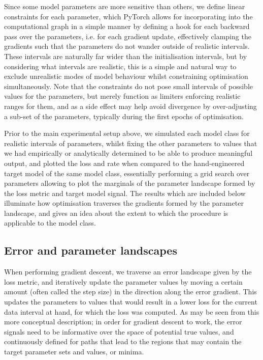 \documentclass[mphil,deptreport,ianc]{infthesis} %
\begin{document}
Since some model parameters are more sensitive than others, we define linear constraints for each parameter, which PyTorch allows for incorporating into the computational graph in a simple manner by defining a hook for each backward pass over the parameters, i.e. for each gradient update, effectively clamping the gradients such that the parameters do not wander outside of realistic intervals. 
These intervals are naturally far wider than the initialisation intervals, but by considering what intervals are realistic, this is a simple and natural way to exclude unrealistic modes of model behaviour whilst constraining optimisation simultaneously.
Note that the constraints do not pose small intervals of possible values for the parameters, but merely function as limiters enforcing realistic ranges for them, and as a side effect may help avoid divergence by over-adjusting a sub-set of the parameters, typically during the first epochs of optimisation.


Prior to the main experimental setup above, we simulated each model class for realistic intervals of parameters, whilst fixing the other parameters to values that we had empirically or analytically determined to be able to produce meaningful output, and plotted the loss and rate when compared to the hand-engineered target model of the same model class, essentially performing a grid search over parameters allowing to plot the marginals of the parameter landscape formed by the loss metric and target model signal.
The results which are included below illuminate how optimisation traverses the gradients formed by the parameter landscape, and gives an idea about the extent to which the procedure is applicable to the model class.


\subsection{Error and parameter landscapes}\label{sect:e_landscapes}

When performing gradient descent, we traverse an error landscape given by the loss metric, and iteratively update the parameter values by moving a certain amount (often called the step size) in the direction along the error gradient. 
This updates the parameters to values that would result in a lower loss for the current data interval at hand, for which the loss was computed.
As may be seen from this more conceptual description; in order for gradient descent to work, the error signals need to be informative over the space of potential true values, and continuously defined for paths that lead to the regions that may contain the target parameter sets and values, or minima.
\end{document}
